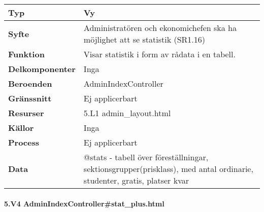 \documentclass[a4paper, twoside, 11pt, titlepage]{article}
\begin{document}
			\begin {table} [ht] \begin{tabular} {  p{3.5cm} p{11.6cm} }
				\hline
				{\sffamily\textbf{Typ}} & {Vy} \\
				\hline
				{\sffamily\textbf{Syfte}} & {Administratören och ekonomichefen ska ha möjlighet att se statistik (SR1.16)} \\
				\hline
				{\sffamily\textbf{Funktion}} & {Visar statistik i form av rådata i en tabell.} \\
				\hline
				{\sffamily\textbf{Delkomponenter}} & {Inga} \\
				\hline
				{\sffamily\textbf{Beroenden}} & {AdminIndexController} \\
				\hline
				{\sffamily\textbf{Gränssnitt}} & {Ej applicerbart} \\
				\hline
				{\sffamily\textbf{Resurser}} & {5.L1 admin\_layout.html} \\
				\hline
				{\sffamily\textbf{Källor}} & {Inga} \\
				\hline
				{\sffamily\textbf{Process}} & {Ej applicerbart} \\
				\hline
				{\sffamily\textbf{Data}} & {@stats - tabell över föreställningar, sektionsgrupper(prisklass), med antal ordinarie, studenter, gratis, platser kvar} \\
				\hline
			\end{tabular} \end{table} \FloatBarrier


			\clearpage %
			\paragraph{5.V4 AdminIndexController\#stat\_plus.html}\
\end{document}
